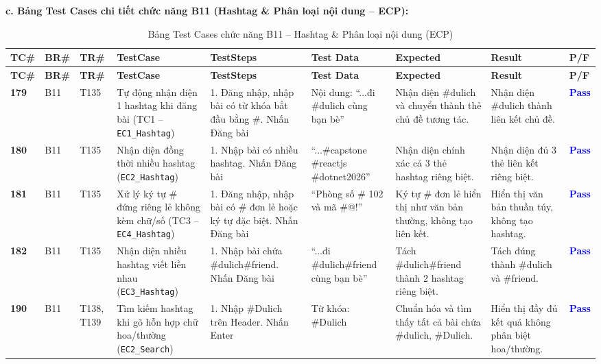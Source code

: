 \documentclass[11pt,a4paper]{article}
\begin{document}
\noindent\textbf{c. Bảng Test Cases chi tiết chức năng B11 (Hashtag \& Phân loại nội dung -- ECP):}
\begingroup
\scriptsize
\setlength{\tabcolsep}{3pt}
\begin{longtable}{|C{0.9cm}|C{0.7cm}|C{0.9cm}|L{2.0cm}|L{3.0cm}|L{2.25cm}|L{2.6cm}|L{2.5cm}|C{0.85cm}|}
\hline
{}
\textbf{TC\#} & \textbf{BR\#} & \textbf{TR\#} & \textbf{TestCase} & \textbf{TestSteps} & \textbf{Test Data} & \textbf{Expected} & \textbf{Result} & \textbf{P/F} \tabularnewline
\hline
\endfirsthead
\hline
{}
\textbf{TC\#} & \textbf{BR\#} & \textbf{TR\#} & \textbf{TestCase} & \textbf{TestSteps} & \textbf{Test Data} & \textbf{Expected} & \textbf{Result} & \textbf{P/F} \tabularnewline
\hline
\endhead
\hline
\endfoot
\hline
\caption{Bảng Test Cases chức năng B11 -- Hashtag \& Phân loại nội dung (ECP)}
\endlastfoot
\textbf{179} & B11 & T135 & Tự động nhận diện 1 hashtag khi đăng bài (TC1 -- \texttt{EC1\_Hashtag}) & 1. Đăng nhập, nhập bài có từ khóa bắt đầu bằng \#. Nhấn Đăng bài & Nội dung: ``...đi \#dulich cùng bạn bè'' & Nhận diện \#dulich và chuyển thành thẻ chủ đề tương tác. & Nhận diện \#dulich thành liên kết chủ đề. & \textcolor{blue}{\textbf{Pass}} \\ \hline
\textbf{180} & B11 & T135 & Nhận diện đồng thời nhiều hashtag (\texttt{EC2\_Hashtag}) & 1. Nhập bài có nhiều hashtag. Nhấn Đăng bài & ``...\#capstone \#reactjs \#dotnet2026'' & Nhận diện chính xác cả 3 thẻ hashtag riêng biệt. & Nhận diện đủ 3 thẻ liên kết riêng biệt. & \textcolor{blue}{\textbf{Pass}} \\ \hline
\textbf{181} & B11 & T135 & Xử lý ký tự \# đứng riêng lẻ không kèm chữ/số (TC3 -- \texttt{EC4\_Hashtag}) & 1. Đăng nhập, nhập bài có \# đơn lẻ hoặc ký tự đặc biệt. Nhấn Đăng bài & ``Phòng số \# 102 và mã \#@!'' & Ký tự \# đơn lẻ hiển thị như văn bản thường, không tạo liên kết. & Hiển thị văn bản thuần túy, không tạo hashtag. & \textcolor{blue}{\textbf{Pass}} \\ \hline
\textbf{182} & B11 & T135 & Nhận diện nhiều hashtag viết liền nhau (\texttt{EC3\_Hashtag}) & 1. Nhập bài chứa \#dulich\#friend. Nhấn Đăng bài & ``...đi \#dulich\#friend cùng bạn bè'' & Tách \#dulich\#friend thành 2 hashtag riêng biệt. & Tách đúng thành \#dulich và \#friend. & \textcolor{blue}{\textbf{Pass}} \\ \hline
\textbf{190} & B11 & T138, T139 & Tìm kiếm hashtag khi gõ hỗn hợp chữ hoa/thường (\texttt{EC2\_Search}) & 1. Nhập \#Dulich trên Header. Nhấn Enter & Từ khóa: \#Dulich & Chuẩn hóa và tìm thấy tất cả bài chứa \#dulich, \#Dulich. & Hiển thị đầy đủ kết quả không phân biệt hoa/thường. & \textcolor{blue}{\textbf{Pass}} \\ \hline

\end{longtable}
\end{document}
